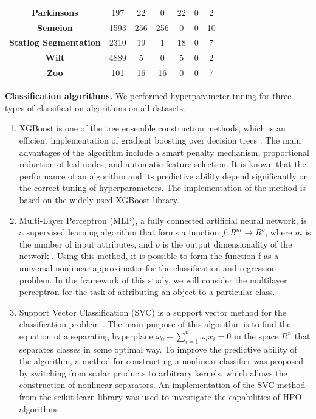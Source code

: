 \documentclass[preprint,12pt]{elsarticle}
\begin{document}
\begin{table}[ht]
{\begin{tabular}{ccccccc}
\textbf{Parkinsons}                                                      & 197   & 22         & 0   & 22    & 0           & 2       \\
\textbf{Semeion}                                                         & 1593  & 256        & 256 & 0     & 0           & 10      \\
\textbf{Statlog Segmentation}                                            & 2310  & 19         & 1   & 18    & 0           & 7       \\
\textbf{Wilt}                                                            & 4889  & 5          & 0   & 5     & 0           & 2       \\
\textbf{Zoo}                                                             & 101   & 16         & 16  & 0     & 0           & 7       \\ \hline
\end{tabular}
}
\end{table}

\textbf{Classification algorithms.} We performed hyperparameter tuning for three types of classification algorithms on all datasets.
\begin{enumerate}
	\item XGBoost is one of the tree ensemble construction methods, which is an efficient implementation of gradient boosting over decision trees \cite{XGBoost2016}. The main advantages of the algorithm include a smart penalty mechanism, proportional reduction of leaf nodes, and automatic feature selection. It is known that the performance of an algorithm and its predictive ability depend significantly on the correct tuning of hyperparameters. The implementation of the method is based on the widely used XGBoost library.
 \item Multi-Layer Perceptron (MLP), a fully connected artificial neural network, is a supervised learning algorithm that forms a function $f : R^m \to R^o$, where $m$ is the number of input attributes, and $o$ is the output dimensionality of the network \cite{GARDNER19982627}. Using this method, it is possible to form the function f as a universal nonlinear approximator for the classification and regression problem. In the framework of this study, we will consider the multilayer perceptron for the task of attributing an object to a particular class.
 \item Support Vector Classification (SVC) is a support vector method for the classification problem \cite{SVC}. The main purpose of this algorithm is to find the equation of a separating hyperplane $\omega_0 + \sum_{i=1}^n \omega_i x_i=0$ in the space $R^n$ that separates classes in some optimal way. To improve the predictive ability of the algorithm, a method for constructing a nonlinear classifier was proposed by switching from scalar products to arbitrary kernels, which allows the construction of nonlinear separators. An implementation of the SVC method from the scikit-learn library was used to investigate the capabilities of HPO algorithms.

\end{enumerate}
\end{document}
